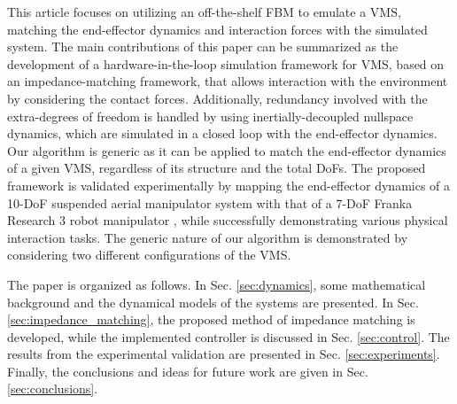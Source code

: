 \documentclass[../main.tex]{subfiles}
\begin{document}
This article focuses on utilizing an off-the-shelf FBM to emulate a VMS, matching the end-effector dynamics and interaction forces with the simulated system. The main contributions of this paper can be summarized as the development of a hardware-in-the-loop simulation framework for VMS, based on an impedance-matching framework, that allows interaction with the environment by considering the contact forces. Additionally, redundancy involved with the extra-degrees of freedom is handled by using inertially-decoupled nullspace dynamics, which are simulated in a closed loop with the end-effector dynamics. Our algorithm is generic as it can be applied to match the end-effector dynamics of a given VMS, regardless of its structure and the total DoFs. The proposed framework is validated experimentally by mapping the end-effector dynamics of a 10-DoF suspended aerial manipulator system with that of a 7-DoF Franka Research 3 robot manipulator \cite{haddadin2022}, while successfully demonstrating various physical interaction tasks. The generic nature of our algorithm is demonstrated by considering two different configurations of the VMS.

The paper is organized as follows. In Sec. \ref{sec:dynamics}, some mathematical background and the dynamical models of the systems are presented. In Sec. \ref{sec:impedance_matching}, the proposed method of impedance matching is developed, while the implemented controller is discussed in Sec. \ref{sec:control}. The results from the experimental validation are presented in Sec. \ref{sec:experiments}. Finally, the conclusions and ideas for future work are given in Sec. \ref{sec:conclusions}.
\end{document}
